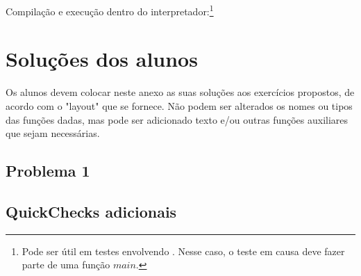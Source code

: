 \documentclass[a4paper]{article}
\newcommand{\Varid}[1]{\mathit{#1}}
\def\resethooks{%
  \global\let\SaveRestoreHook\empty
  \global\let\ColumnHook\empty}
\let\hspre\empty
\let\hspost\empty
\begin{document}
Compilação e execução dentro do interpretador:\footnote{Pode ser útil em testes
envolvendo . Nesse caso, o teste em causa deve fazer parte de uma função
\ensuremath{\Varid{main}}.}
\resethooks


\section{Soluções dos alunos}\label{sec:resolucao}
Os alunos devem colocar neste anexo as suas soluções aos exercícios
propostos, de acordo com o "layout" que se fornece. Não podem ser
alterados os nomes ou tipos das funções dadas, mas pode ser adicionado texto e/ou 
outras funções auxiliares que sejam necessárias.

\subsection*{Problema 1}
\subsection*{QuickChecks adicionais}
\end{document}
